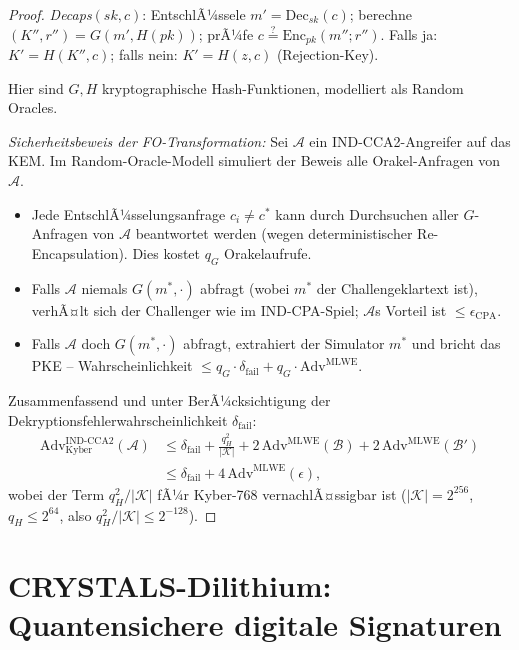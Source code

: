 ﻿\documentclass[a4paper,12pt]{article}
\theoremstyle{definition}
\begin{document}
\begin{proof}
\emph{Decaps}$(sk, c)$: EntschlÃ¼ssele $m' = \mathrm{Dec}_{sk}(c)$;
berechne $(K'', r'') = G(m', H(pk))$; prÃ¼fe $c \stackrel{?}{=} \mathrm{Enc}_{pk}(m''; r'')$.
Falls ja: $K' = H(K'', c)$; falls nein: $K' = H(z, c)$ (Rejection-Key).

Hier sind $G, H$ kryptographische Hash-Funktionen, modelliert als Random Oracles.

\emph{Sicherheitsbeweis der FO-Transformation:}
Sei $\mathcal{A}$ ein IND-CCA2-Angreifer auf das KEM. Im Random-Oracle-Modell
simuliert der Beweis alle Orakel-Anfragen von $\mathcal{A}$.

\begin{itemize}
\item Jede EntschlÃ¼sselungsanfrage $c_i \neq c^*$ kann durch
  Durchsuchen aller $G$-Anfragen von $\mathcal{A}$ beantwortet werden
  (wegen deterministischer Re-Encapsulation). Dies kostet $q_G$ Orakelaufrufe.

\item Falls $\mathcal{A}$ niemals $G(m^*, \cdot)$ abfragt (wobei $m^*$
  der Challengeklartext ist), verhÃ¤lt sich der Challenger wie im
  IND-CPA-Spiel; $\mathcal{A}$s Vorteil ist $\leq \epsilon_\mathrm{CPA}$.

\item Falls $\mathcal{A}$ doch $G(m^*, \cdot)$ abfragt, extrahiert der
  Simulator $m^*$ und bricht das PKE -- Wahrscheinlichkeit $\leq q_G \cdot
  \delta_\mathrm{fail} + q_G \cdot \mathrm{Adv}^\mathrm{MLWE}$.
\end{itemize}

Zusammenfassend und unter BerÃ¼cksichtigung der
Dekryptionsfehlerwahrscheinlichkeit $\delta_\mathrm{fail}$:
\begin{align*}
\mathrm{Adv}^{\mathrm{IND\text{-}CCA2}}_{\mathrm{Kyber}}(\mathcal{A})
&\leq \delta_\mathrm{fail}
  + \frac{q_H^2}{|\mathcal{K}|}
  + 2\,\mathrm{Adv}^\mathrm{MLWE}(\mathcal{B})
  + 2\,\mathrm{Adv}^\mathrm{MLWE}(\mathcal{B}') \\
&\leq \delta_\mathrm{fail} + 4\,\mathrm{Adv}^\mathrm{MLWE}(\epsilon),
\end{align*}
wobei der Term $q_H^2/|\mathcal{K}|$ fÃ¼r Kyber-768 vernachlÃ¤ssigbar ist
($|\mathcal{K}| = 2^{256}$, $q_H \leq 2^{64}$, also $q_H^2/|\mathcal{K}| \leq 2^{-128}$).
\end{proof}

\section{CRYSTALS-Dilithium: Quantensichere digitale Signaturen}
\end{document}
